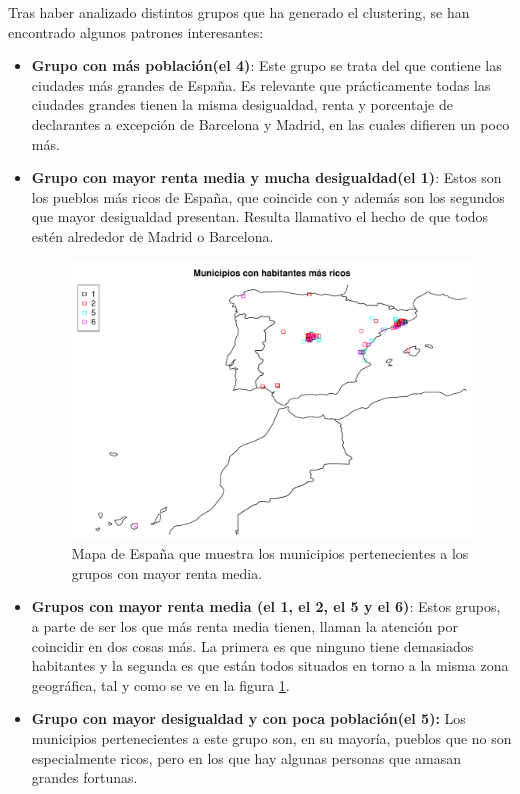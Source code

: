 \documentclass[acmtog, screen]{acmart}
\begin{document}
Tras haber analizado distintos grupos que ha generado el clustering, se han encontrado algunos patrones interesantes:
\begin{itemize}
	\item \textbf{Grupo con más población(el 4)}: Este grupo se trata del que contiene las ciudades más grandes de España. Es relevante que prácticamente todas las ciudades grandes tienen la misma desigualdad, renta y porcentaje de declarantes a excepción de Barcelona y Madrid, en las cuales difieren un poco más.
	\item \textbf{Grupo con mayor renta media y mucha desigualdad(el 1)}: Estos son los pueblos más ricos de España, que coincide con y además son los segundos que mayor desigualdad presentan. Resulta llamativo el hecho de que todos estén alrededor de Madrid o Barcelona.
	\begin{figure}
		\includegraphics[width=\columnwidth]{mapaRicos}
		\caption{Mapa de España que muestra los municipios pertenecientes a los grupos con mayor renta media.}
		\label{fig:mapaRicos}
	\end{figure}
	\item \textbf{Grupos con mayor renta media (el 1, el 2, el 5 y el 6)}: Estos grupos, a parte de ser los que más renta media tienen, llaman la atención por coincidir en dos cosas más. La primera es que ninguno tiene demasiados habitantes y la segunda es que están todos situados en torno a la misma zona geográfica, tal y como se ve en la figura \ref{fig:mapaRicos}.
	\item \textbf{Grupo con mayor desigualdad y con poca población(el 5):} Los municipios pertenecientes a este grupo son, en su mayoría, pueblos que no son especialmente ricos, pero en los que hay algunas personas que amasan grandes fortunas.

\end{itemize}
\end{document}

